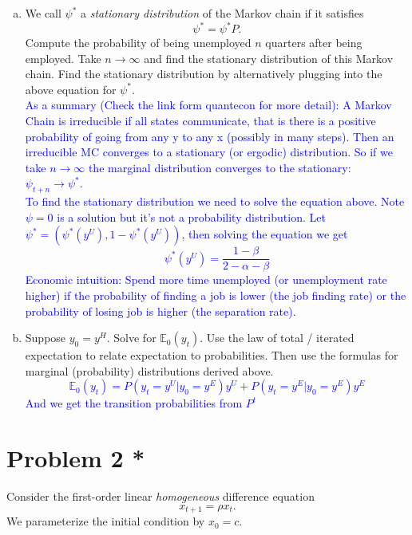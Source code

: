 \documentclass[11pt]{extarticle}
\theoremstyle{plain}
\theoremstyle{definition}
\begin{document}
\begin{enumerate}[(a)]
\item We call $\psi^*$ a \textit{stationary distribution} of the Markov chain if it satisfies 
\begin{equation*}
	\psi^* = \psi^* P.
\end{equation*}
Compute the probability of being unemployed $n$ quarters after being employed. Take $n \to \infty$ and find the stationary distribution of this Markov chain. Find the stationary distribution by alternatively plugging into the above equation for $\psi^*$. \\
\textcolor{blue}{As a summary (Check the link form quantecon for more detail): A Markov Chain is irreducible if all states communicate, that is there is a positive probability of going from any y to any x (possibly in many steps). Then an irreducible MC converges to a stationary (or ergodic) distribution. So if we take $n\rightarrow \infty$ the marginal distribution converges to the stationary: $\psi_{t+n}\rightarrow \psi^*$.\\
To find the stationary distribution we need to solve the equation above. Note $\psi =0$ is a solution but it's not a probability distribution. Let $\psi^* = (\psi^*(y^U),1-\psi^*(y^U))$, then solving the equation we get $$\psi^*(y^U)=\frac{1-\beta}{2-\alpha - \beta }$$
Economic intuition: Spend more time unemployed (or unemployment rate higher) if the probability of finding a job is lower (the job finding rate) or the probability of losing job is higher (the separation rate). }
\item Suppose $y_0 = y^H$. Solve for $\mathbb E_0 (y_t)$. Use the law of total / iterated expectation to relate expectation to probabilities. Then use the formulas for marginal (probability) distributions derived above. 
\textcolor{blue}{$$\mathbb E_0 (y_t)=P(y_t=y^U|y_0=y^E)y^U+P(y_t=y^E|y_0=y^E)y^E $$ And we get the transition probabilities from $P^t$ }
\end{enumerate}



\vspace{10mm} 
\section*{Problem 2 *}

Consider the first-order linear \textit{homogeneous} difference equation 
\begin{equation*}
	x_{t+1} = \rho x_t.
\end{equation*}
We parameterize the initial condition by $x_0 = c$. 
\end{document}
